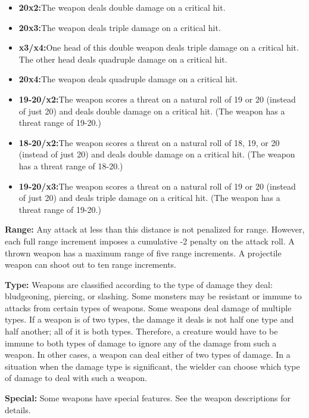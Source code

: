 \begin{itemize}
  \item\noindent\textbf{20x2:}{The weapon deals double damage on a critical hit.}
  \item\noindent\textbf{20x3:}{The weapon deals triple damage on a critical hit.}
  \item\noindent\textbf{x3/x4:}{One head of this double weapon deals triple damage on a critical hit. The other head deals quadruple damage on a critical hit.}
  \item\noindent\textbf{20x4:}{The weapon deals quadruple damage on a critical hit.}
  \item\noindent\textbf{19-20/x2:}{The weapon scores a threat on a natural roll of 19 or 20 (instead of just 20) and deals double damage on a critical hit. (The weapon has a threat range of 19-20.)}
  \item\noindent\textbf{18-20/x2:}{The weapon scores a threat on a natural roll of 18, 19, or 20 (instead of just 20) and deals double damage on a critical hit. (The weapon has a threat range of 18-20.)}
  \item\noindent\textbf{19-20/x3:}{The weapon scores a threat on a natural roll of 19 or 20 (instead of just 20) and deals triple damage on a critical hit. (The weapon has a threat range of 19-20.)}
\end{itemize}

\textbf{Range:} Any attack at less than this distance is not penalized for range. However, each full range increment imposes a cumulative -2 penalty on the attack roll. A thrown weapon has a maximum range of five range increments. A projectile weapon can shoot out to ten range increments.

\textbf{Type:} Weapons are classified according to the type of damage they deal: bludgeoning, piercing, or slashing. Some monsters may be resistant or immune to attacks from certain types of weapons. Some weapons deal damage of multiple types. If a weapon is of two types, the damage it deals is not half one type and half another; all of it is both types. Therefore, a creature would have to be immune to both types of damage to ignore any of the damage from such a weapon.  In other cases, a weapon can deal either of two types of damage. In a situation when the damage type is significant, the wielder can choose which type of damage to deal with such a weapon.

\textbf{Special:} Some weapons have special features. See the weapon descriptions for details.

